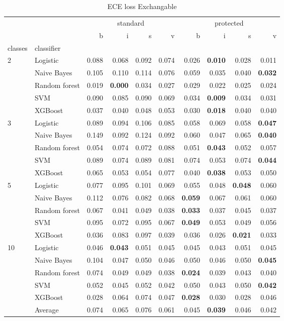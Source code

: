 \begin{table}
\caption{ECE loss Exchangable}
\begin{tabular}{l|l|rrrr|rrrr}
\toprule
 &  & \multicolumn{4}{c}{standard} & \multicolumn{4}{c}{protected} \\
 &  & b & i & s & v & b & i & s & v \\
classes & classifier &  &  &  &  &  &  &  &  \\
\midrule
\midrule
\multirow[c]{5}{*}{2} & Logistic & 0.088 & 0.068 & 0.092 & 0.074 & 0.026 & \textbf{0.010} & 0.028 & 0.011 \\
 & Naive Bayes & 0.105 & 0.110 & 0.114 & 0.076 & 0.059 & 0.035 & 0.040 & \textbf{0.032} \\
 & Random forest & 0.019 & \textbf{0.000} & 0.034 & 0.027 & 0.029 & 0.022 & 0.025 & 0.024 \\
 & SVM & 0.090 & 0.085 & 0.090 & 0.069 & 0.034 & \textbf{0.009} & 0.034 & 0.031 \\
 & XGBoost & 0.037 & 0.040 & 0.048 & 0.053 & 0.030 & \textbf{0.018} & 0.040 & 0.040 \\
\midrule
\multirow[c]{5}{*}{3} & Logistic & 0.089 & 0.094 & 0.106 & 0.085 & 0.058 & 0.069 & 0.058 & \textbf{0.047} \\
 & Naive Bayes & 0.149 & 0.092 & 0.124 & 0.092 & 0.060 & 0.047 & 0.065 & \textbf{0.040} \\
 & Random forest & 0.054 & 0.074 & 0.072 & 0.088 & 0.051 & \textbf{0.043} & 0.052 & 0.057 \\
 & SVM & 0.089 & 0.074 & 0.089 & 0.081 & 0.074 & 0.053 & 0.074 & \textbf{0.044} \\
 & XGBoost & 0.065 & 0.053 & 0.054 & 0.077 & 0.040 & \textbf{0.038} & 0.053 & 0.050 \\
\midrule
\multirow[c]{5}{*}{5} & Logistic & 0.077 & 0.095 & 0.101 & 0.069 & 0.055 & 0.048 & \textbf{0.048} & 0.060 \\
 & Naive Bayes & 0.112 & 0.076 & 0.082 & 0.068 & \textbf{0.059} & 0.067 & 0.061 & 0.060 \\
 & Random forest & 0.067 & 0.041 & 0.049 & 0.038 & \textbf{0.033} & 0.037 & 0.045 & 0.037 \\
 & SVM & 0.095 & 0.072 & 0.095 & 0.067 & \textbf{0.049} & 0.053 & 0.049 & 0.056 \\
 & XGBoost & 0.036 & 0.083 & 0.097 & 0.039 & 0.036 & 0.026 & \textbf{0.021} & 0.033 \\
\midrule
\multirow[c]{5}{*}{10} & Logistic & 0.046 & \textbf{0.043} & 0.051 & 0.045 & 0.045 & 0.043 & 0.051 & 0.045 \\
 & Naive Bayes & 0.104 & 0.047 & 0.050 & 0.046 & 0.050 & 0.046 & 0.050 & \textbf{0.045} \\
 & Random forest & 0.074 & 0.049 & 0.049 & 0.038 & \textbf{0.024} & 0.039 & 0.043 & 0.040 \\
 & SVM & 0.052 & 0.045 & 0.052 & 0.042 & 0.050 & 0.043 & 0.050 & \textbf{0.042} \\
 & XGBoost & 0.028 & 0.064 & 0.074 & 0.047 & \textbf{0.028} & 0.030 & 0.028 & 0.046 \\\midrule\ & Average & 0.074 & 0.065 & 0.076 & 0.061 & 0.045 & \textbf{0.039} & 0.046 & 0.042 \\
\bottomrule
\end{tabular}
\end{table}
